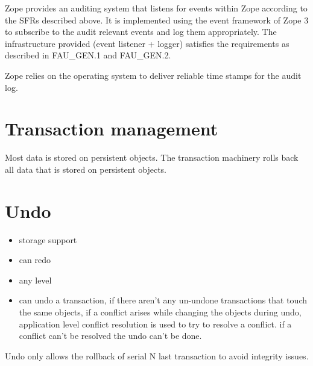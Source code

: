 \documentclass[10pt,a4paper,english]{book}
\begin{document}
Zope provides an auditing system that listens for events within Zope according
to the SFRs described above. It is implemented using the event framework of
Zope 3 to subscribe to the audit relevant events and log them appropriately.
The infrastructure provided (event listener + logger) satisfies the
requirements as described in FAU{\_}GEN.1 and FAU{\_}GEN.2.

Zope relies on the operating system to deliver reliable time stamps for the
audit log.



\hypertarget{transaction-management}{}
\section{Transaction management}

Most data is stored on persistent objects. The transaction machinery rolls back
all data that is stored on persistent objects.



\hypertarget{undo}{}
\section{Undo}
\begin{itemize}
\item {} 
storage support

\item {} 
can redo

\item {} 
any level

\item {} 
can undo a transaction, if there aren't any un-undone transactions that touch
the same objects, if a conflict arises while changing the objects during
undo, application level conflict resolution is used to try to resolve a
conflict. if a conflict can't be resolved the undo can't be done.

\end{itemize}

Undo only allows the rollback of serial N last transaction to avoid integrity issues.



\hypertarget{publication-server}{}
\end{document}
